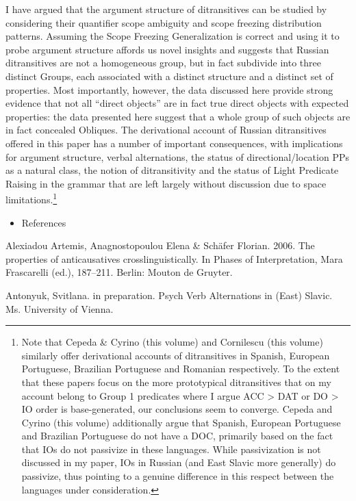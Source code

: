 \documentclass[output=paper,modfonts, nonflat]{langsci/langscibook}
\begin{document}
\begin{styleinnerExample}
I have argued that the argument structure of ditransitives can be studied by considering their quantifier scope ambiguity and scope freezing distribution patterns. Assuming the Scope Freezing Generalization is correct and using it to probe argument structure affords us novel insights and suggests that Russian ditransitives are not a homogeneous group, but in fact subdivide into three distinct Groups, each associated with a distinct structure and a distinct set of properties. Most importantly, however, the data discussed here provide strong evidence that not all “direct objects” are in fact true direct objects with expected properties: the data presented here suggest that a whole group of such objects are in fact concealed Obliques. The derivational account of Russian ditransitives offered in this paper has a number of important consequences, with implications for argument structure, verbal alternations, the status of directional/location PPs as a natural class, the notion of ditransitivity and the status of Light Predicate Raising in the grammar that are left largely without discussion due to space limitations.\footnote{Note that Cepeda \& Cyrino (this volume) and Cornilescu (this volume) similarly offer derivational accounts of ditransitives in Spanish, European Portuguese, Brazilian Portuguese and Romanian respectively. To the extent that these papers focus on the more prototypical ditransitives that on my account belong to Group 1 predicates where I argue ACC > DAT or DO > IO order is base-generated, our conclusions seem to converge. Cepeda and Cyrino (this volume) additionally argue that Spanish, European Portuguese and Brazilian Portuguese do not have a DOC, primarily based on the fact that IOs do not passivize in these languages. While passivization is not discussed in my paper, IOs in Russian (and East Slavic more generally) do passivize, thus pointing to a genuine difference in this respect between the languages under consideration.} 

\begin{itemize}
\item References
\end{itemize}

Alexiadou Artemis, Anagnostopoulou Elena \& Schäfer Florian. 2006. The properties of anticausatives crosslinguistically. In Phases of Interpretation, Mara Frascarelli (ed.), 187–211. Berlin: Mouton de Gruyter.

Antonyuk, Svitlana. in preparation. Psych Verb Alternations in (East) Slavic. Ms. University of Vienna.


\end{styleinnerExample}
\end{document}

